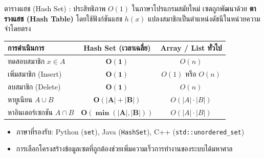 \begin{frame}{ตารางแฮช (Hash Set) : ประสิทธิภาพ $O(1)$}
  ในภาษาโปรแกรมสมัยใหม่ เซตถูกพัฒนาด้วย \textbf{ตารางแฮช (Hash Table)}
  โดยใช้ฟังก์ชันแฮช $h(x)$ แปลงสมาชิกเป็นตำแหน่งดัชนีในหน่วยความจำโดยตรง
  \begin{center}\small
  \begin{tabular}{|l|c|c|}
    \hline
    \textbf{การดำเนินการ} & \textbf{Hash Set (เวลาเฉลี่ย)} & \textbf{Array / List ทั่วไป} \\ \hline
    ทดสอบสมาชิก $x \in A$ & $\mathbf{O(1)}$ & $O(n)$ \\ \hline
    เพิ่มสมาชิก (Insert) & $\mathbf{O(1)}$ & $O(1)$ หรือ $O(n)$ \\ \hline
    ลบสมาชิก (Delete) & $\mathbf{O(1)}$ & $O(n)$ \\ \hline
    หายูเนียน $A \cup B$ & $\mathbf{O(|A| + |B|)}$ & $O(|A| \cdot |B|)$ \\ \hline
    หาอินเตอร์เซกชัน $A \cap B$ & $\mathbf{O(\min(|A|, |B|))}$ & $O(|A| \cdot |B|)$ \\ \hline
  \end{tabular}
  \end{center}
  \vspace{0.2em}
  \begin{itemize}
    \item ภาษาที่รองรับ: Python (\texttt{set}), Java (\texttt{HashSet}), C++ (\texttt{std::unordered\_set})
    \item การเลือกโครงสร้างข้อมูลเซตที่ถูกต้องช่วยเพิ่มความเร็วการทำงานของระบบได้มหาศาล
  \end{itemize}
\end{frame}

